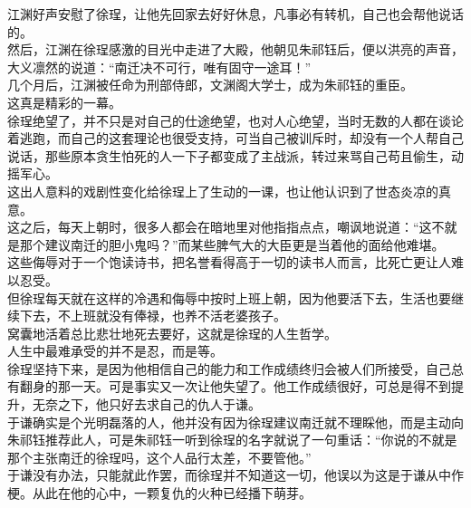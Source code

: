 \begin{multicols}{\theparacolNo}
江渊好声安慰了徐珵，让他先回家去好好休息，凡事必有转机，自己也会帮他说话的。\\

然后，江渊在徐珵感激的目光中走进了大殿，他朝见朱祁钰后，便以洪亮的声音，大义凛然的说道：“南迁决不可行，唯有固守一途耳！”\\

几个月后，江渊被任命为刑部侍郎，文渊阁大学士，成为朱祁钰的重臣。\\

这真是精彩的一幕。\\

徐珵绝望了，并不只是对自己的仕途绝望，也对人心绝望，当时无数的人都在谈论着逃跑，而自己的这套理论也很受支持，可当自己被训斥时，却没有一个人帮自己说话，那些原本贪生怕死的人一下子都变成了主战派，转过来骂自己苟且偷生，动摇军心。\\

这出人意料的戏剧性变化给徐珵上了生动的一课，也让他认识到了世态炎凉的真意。\\

这之后，每天上朝时，很多人都会在暗地里对他指指点点，嘲讽地说道：“这不就是那个建议南迁的胆小鬼吗？”而某些脾气大的大臣更是当着他的面给他难堪。\\

这些侮辱对于一个饱读诗书，把名誉看得高于一切的读书人而言，比死亡更让人难以忍受。\\

但徐珵每天就在这样的冷遇和侮辱中按时上班上朝，因为他要活下去，生活也要继续下去，不上班就没有俸禄，也养不活老婆孩子。\\

窝囊地活着总比悲壮地死去要好，这就是徐珵的人生哲学。\\

人生中最难承受的并不是忍，而是等。\\

徐珵坚持下来，是因为他相信自己的能力和工作成绩终归会被人们所接受，自己总有翻身的那一天。可是事实又一次让他失望了。他工作成绩很好，可总是得不到提升，无奈之下，他只好去求自己的仇人于谦。\\

于谦确实是个光明磊落的人，他并没有因为徐珵建议南迁就不理睬他，而是主动向朱祁钰推荐此人，可是朱祁钰一听到徐珵的名字就说了一句重话：“你说的不就是那个主张南迁的徐珵吗，这个人品行太差，不要管他。”\\

于谦没有办法，只能就此作罢，而徐珵并不知道这一切，他误以为这是于谦从中作梗。从此在他的心中，一颗复仇的火种已经播下萌芽。\\


\end{multicols}
